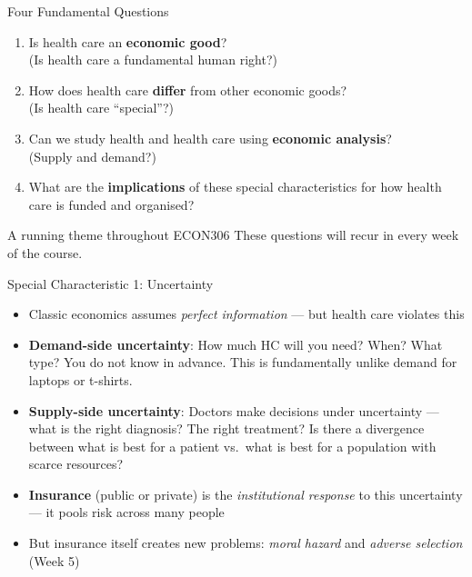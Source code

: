 \documentclass[aspectratio=169, 12pt]{beamer}
\begin{document}
\begin{frame}{Four Fundamental Questions}
  \begin{enumerate}
    \item Is health care an \textbf{economic good}?\\
          {\small (Is health care a fundamental human right?)}
    \vspace{0.4em}
    \item How does health care \textbf{differ} from other economic goods?\\
          {\small (Is health care ``special''?)}
    \vspace{0.4em}
    \item Can we study health and health care using \textbf{economic analysis}?\\
          {\small (Supply and demand?)}
    \vspace{0.4em}
    \item What are the \textbf{implications} of these special characteristics for how health
          care is funded and organised?
  \end{enumerate}
  \vspace{0.5em}
  \begin{alertblock}{A running theme throughout ECON306}
    These questions will recur in every week of the course.
  \end{alertblock}
\end{frame}

\begin{frame}{Special Characteristic 1: Uncertainty}
  \begin{itemize}
    \item Classic economics assumes \emph{perfect information} --- but health care violates this
    \item \textbf{Demand-side uncertainty}: How much HC will you need? When? What type?
          You do not know in advance. This is fundamentally unlike demand for laptops or t-shirts.
    \item \textbf{Supply-side uncertainty}: Doctors make decisions under uncertainty --- what
          is the right diagnosis? The right treatment? Is there a divergence between what is
          best for a patient vs.\ what is best for a population with scarce resources?
    \item \textbf{Insurance} (public or private) is the \emph{institutional response} to this
          uncertainty --- it pools risk across many people
    \item But insurance itself creates new problems: \textit{moral hazard} and
          \textit{adverse selection} (Week 5)
  \end{itemize}
\end{frame}
\end{document}
